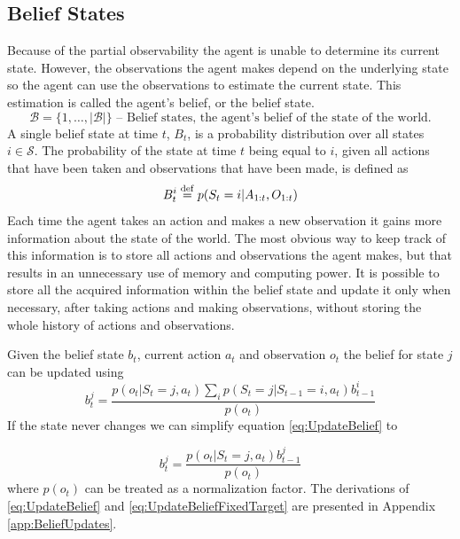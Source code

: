 \subsection{Belief States}
Because of the partial observability the agent is unable to determine its current state. However, the observations the agent makes depend on the underlying state so the agent can use the observations to estimate the current state. This estimation is called the agent's belief, or the belief state.
\begin{equation*}
  \mathcal{B} = \{1, \dotsc, |\mathcal{B}|\} \text{ -- Belief states, the agent's belief of the state of the world.}
\end{equation*}
A single belief state at time $t$, $B_t$, is a probability distribution over all states $i \in \mathcal{S}$. The probability of the state at time $t$ being equal to $i$, given all actions that have been taken and observations that have been made, is defined as
\begin{equation}
  B_t^i \stackrel{\mathrm{def}}{=} p(S_t = i | A_{1:t}, O_{1:t})
\end{equation}
Each time the agent takes an action and makes a new observation it gains more information about the state of the world. The most obvious way to keep track of this information is to store all actions and observations the agent makes, but that results in an unnecessary use of memory and computing power. It is possible to store all the acquired information within the belief state and update it only when necessary, after taking actions and making observations, without storing the whole history of actions and observations.

Given the belief state $b_t$, current action $a_t$ and observation $o_t$ the belief for state $j$ can be updated using
\begin{equation}
  \label{eq:UpdateBelief}
  b_t^j = \frac{ p(o_t | S_t = j, a_t) \sum_{i} p(S_t = j | S_{t-1} = i, a_t) b_{t-1}^i } { p(o_t) }
\end{equation}
If the state never changes we can simplify equation \eqref{eq:UpdateBelief} to

\begin{equation}
  \label{eq:UpdateBeliefFixedTarget}
  b_t^j = \frac{ p(o_t | S_t = j, a_t) b_{t-1}^j }{ p(o_t) }
\end{equation}
where $p(o_t)$ can be treated as a normalization factor. The derivations of \eqref{eq:UpdateBelief} and \eqref{eq:UpdateBeliefFixedTarget} are presented in Appendix \ref{app:BeliefUpdates}.

